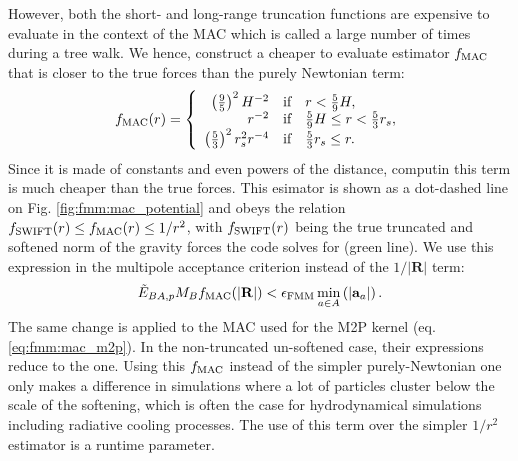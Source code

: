 However, both the short- and long-range truncation functions are
expensive to evaluate in the context of the MAC which is called a
large number of times during a tree walk. We hence, construct a
cheaper to evaluate estimator $f_{\rm MAC}$ that is closer to the true
forces than the purely Newtonian term:
\begin{align}
f_{\rm MAC}(r) =
\left\lbrace\begin{array}{rcl}
  \left(\frac{9}{5}\right)^2 H^{-2} & \mbox{if} & r <
  \frac{5}{9}H,\\
  r^{-2} & \mbox{if} & \frac{5}{9}H \leq r < \frac{5}{3}r_s, \\
  \left(\frac{5}{3}\right)^2 r_s^2 r^{-4} & \mbox{if} & \frac{5}{3}r_s \leq r. \\
\end{array}
\right.
\label{eq:fmm:f_mac}
\end{align}
Since it is made of constants and even powers of the distance,
computin this term is much cheaper than the true forces.  This
esimator is shown as a dot-dashed line on
Fig. \ref{fig:fmm:mac_potential} and obeys the relation $f_{\rm
  SWIFT}(r) \leq f_{\rm MAC}(r) \leq 1/r^2$, with $f_{\rm SWIFT}(r)$
being the true truncated and softened norm of the gravity forces the
code solves for (green line). We use this expression in the multipole
acceptance criterion instead of the $1/|\mathbf{R}|$ term:
\begin{equation}
  \tilde{E}_{BA,p} M_Bf_{\rm MAC}(|\mathbf{R}|) < \epsilon_{\rm FMM} \min_{a\in
    A}\left(|\mathbf{a}_a|\right).
  \label{eq:fmm:mac_f_mac}  
\end{equation}
The same change is applied to the MAC used for the M2P kernel
(eq. \ref{eq:fmm:mac_m2p}). In the non-truncated un-softened case,
their expressions reduce to the \citep{Dehnen2014} one. Using this
$f_{\rm MAC}$ instead of the simpler purely-Newtonian one only makes a
difference in simulations where a lot of particles cluster below the
scale of the softening, which is often the case for hydrodynamical
simulations including radiative cooling processes. The use of this
term over the simpler $1/r^2$ estimator is a runtime parameter.

